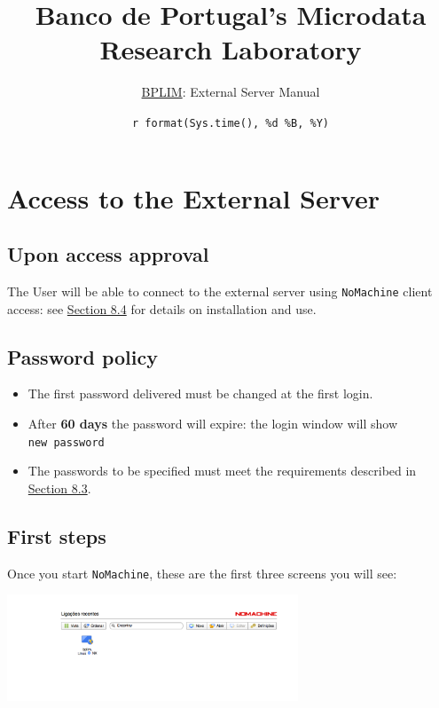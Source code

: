 \documentclass[
  11pt,
  a4paper,
]{article}
\title{Banco de Portugal's Microdata Research Laboratory}
\author{\href{https://bplim.bportugal.pt/}{BPLIM}: External Server
Manual}
\date{\texttt{r\ format(Sys.time(),\ \textquotesingle{}\%d\ \%B,\ \%Y\textquotesingle{})}}
\providecommand{\tightlist}{%
  \setlength{\itemsep}{0pt}\setlength{\parskip}{0pt}}
\begin{document}
\maketitle

{
\setcounter{tocdepth}{2}
\tableofcontents
}
\newpage

\hypertarget{access-to-the-external-server}{%
\section{Access to the External
Server}\label{access-to-the-external-server}}

\hypertarget{upon-access-approval}{%
\subsection{Upon access approval}\label{upon-access-approval}}

The User will be able to connect to the external server using
\texttt{NoMachine} client access: see
\protect\hyperlink{install_nomachine}{Section 8.4} for details on
installation and use.

\hypertarget{password-policy}{%
\subsection{Password policy}\label{password-policy}}

\begin{itemize}
\tightlist
\item
  The first password delivered must be changed at the first login.
\item
  After \textbf{60 days} the password will expire: the login window will
  show \texttt{new\ password}
\item
  The passwords to be specified must meet the requirements described in
  \protect\hyperlink{password}{Section 8.3}.
\end{itemize}

\hypertarget{first-steps}{%
\subsection{First steps}\label{first-steps}}

Once you start \texttt{NoMachine}, these are the first three screens you
will see:

\includegraphics[width=0.65\textwidth,height=\textheight]{./media/image1.png}
\end{document}
